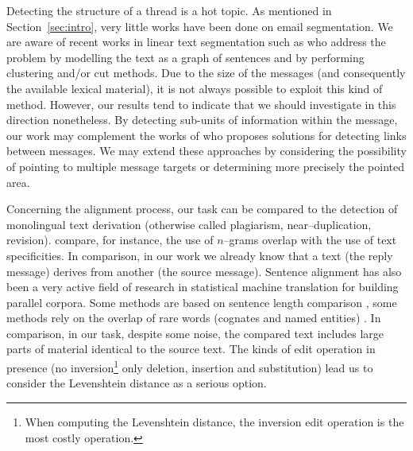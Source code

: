 Detecting the structure of a thread is a hot topic. 
%
As mentioned in Section~\ref{sec:intro}, very little works have been done on email segmentation. 
We are aware of recent works in linear text segmentation such as \cite{kazantseva:2011} who address the problem by modelling the text as a graph of sentences and by performing clustering and/or cut methods. 
%
Due to the size of the messages (and consequently the available lexical material), it is not always possible to exploit this kind of method. However, our results tend to indicate that we should investigate in this direction nonetheless.
%
By detecting sub-units of information within the message, our work may complement the works of \cite{li:2011:threadlinking,kim:2010:taggingandlinking} who proposes solutions for detecting links between messages. 
We may extend these approaches by considering the possibility of pointing to multiple message targets or determining more precisely the pointed area.

Concerning the alignment process, our task can be compared to the detection of monolingual text derivation (otherwise called plagiarism, near–duplication, revision). \cite{poulard:2011:detecting} compare, for instance, the use of $n$–grams overlap with the use of text specificities. 
In comparison, in our work we already know that a text (the reply message) derives from another (the source message). Sentence alignment has also been a very active field of research 
in statistical machine translation for building parallel corpora. %
%
Some methods are based on sentence length comparison \cite{gale:1991}, some methods rely on the overlap of rare words (cognates and named entities) \cite{enright-kondrak:2007:ShortPapers}.
In comparison, %
in our task, despite some noise, the compared text includes large parts of material identical to the source text. 
The kinds of edit operation in presence (no inversion\footnote{When computing the Levenshtein distance, the inversion edit operation is the most costly operation.} only deletion, insertion and substitution) lead us to consider the Levenshtein distance as a serious option.  

